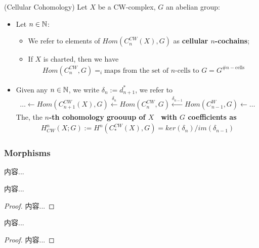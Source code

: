 \documentclass[Total.tex]{subfiles}
\begin{document}
					\begin{Def}
						(Cellular Cohomology) Let $X$ be a CW-complex, $G$ an abelian group:
						\begin{itemize}
							\item Let $n\in \mathbb{N}$:
							\begin{itemize}
								\item We refer to elements of $Hom(C^{CW}_n(X),G)$ as \textbf{cellular $n$-cochains};
								\item If $X$ is charted, then we have
								\begin{gather*}
									Hom(C^{CW}_n,G)=_i\mbox{maps from the set of $n$-cells to }G=G^{\#n-\mbox{cells}}
								\end{gather*}
							\end{itemize}
							\item Given any $n\in \mathbb{N}$, we write $\delta_n:=d^*_{n+1}$, we refer to
							\begin{gather*}
								\dots\leftarrow Hom(C^{CW}_{n+1}(X),G)\stackrel{\delta_n}{\leftarrow} Hom(C_n^{CW},G)\stackrel{\delta_{n-1}}{\leftarrow} Hom(C_{n-1}^W,G)\leftarrow \dots
							\end{gather*}
							The, the \textbf{$n$-th cohomology groouup of $X$　with $G$ coefficients as}
							\begin{gather*}
								H^n_{CW}(X;G):=H^n(C_*^{CW}(X),G)=ker(\delta_n)/im(\delta_{n-1})
							\end{gather*}
						\end{itemize}
					\end{Def}
					\subsubsection{Morphisms}
					\begin{Def}
						内容...
					\end{Def}
					\begin{lemma}
						内容...
					\end{lemma}
					\begin{proof}
						内容...
					\end{proof}
					
					\begin{proposition}
						内容...
					\end{proposition}
					\begin{proof}
						内容...
					\end{proof}
					
\end{document}
